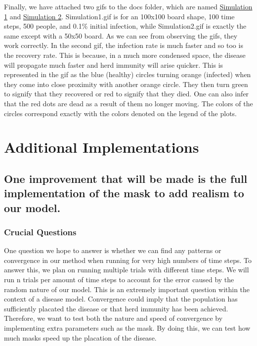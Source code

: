 \documentclass{article}
\begin{document}
Finally, we have attached two gifs to the docs folder, which are named \href{https://github.com/UChi-ComPy23/group-project-group2/blob/main/doc/checkpoint/simulation1.gif}{Simulation 1} and \href{https://github.com/UChi-ComPy23/group-project-group2/blob/main/doc/checkpoint/simulation2.gif}{Simulation 2}. Simulation1.gif is for an 100x100 board shape, 100 time steps, 500 people, and 0.1\% initial infection, while Simulation2.gif is exactly the same except with a 50x50 board. As we can see from observing the gifs, they work correctly. In the second gif, the infection rate is much faster and so too is the recovery rate. This is because, in a much more condensed space, the disease will propagate much faster and herd immunity will arise quicker. This is represented in the gif as the blue (healthy) circles turning orange (infected) when they come into close proximity with another orange circle. They then turn green to signify that they recovered or red to signify that they died. One can also infer that the red dots are dead as a result of them no longer moving. The colors of the circles correspond exactly with the colors denoted on the legend of the plots.\\ 

\section{Additional Implementations }

\subsection{One improvement that will be made is the full implementation of the mask to add realism to our model.}

\subsubsection{Crucial Questions} One question we hope to answer is whether we can find any patterns or convergence in our method when running for very high numbers of time steps. To answer this, we plan on running multiple trials with different time steps. We will run n trials per amount of time steps to account for the error caused by the random nature of our model. This is an extremely important question within the context of a disease model. Convergence could imply that the population has sufficiently placated the disease or that herd immunity has been achieved. Therefore, we want to test both the nature and speed of convergence by implementing extra parameters such as the mask. By doing this, we can test how much masks speed up the placation of the disease. \\
\end{document}
